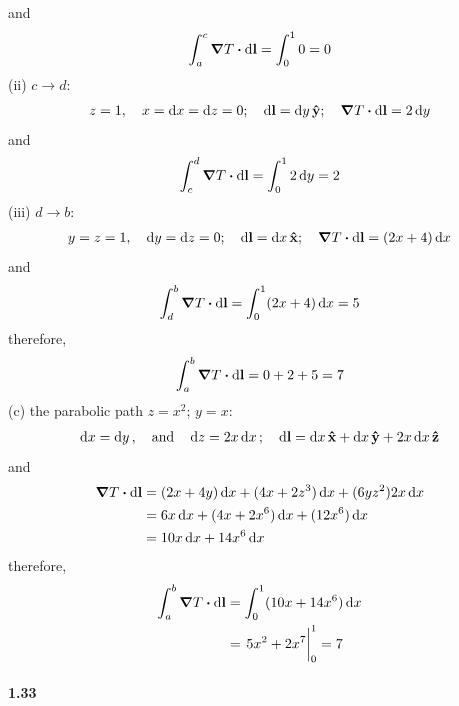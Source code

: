 \documentclass[../main.tex]{subfiles}
\begin{document}
and
\begin{align*}
    \int_a^c \grad{T} \vdot \dd{\vb{l}} = \int_0^1 0 = 0
\end{align*}
(ii) $c \to d$:
\begin{align*}
    z = 1, \quad x = \dd{x} = \dd{z} = 0; \quad \dd{\vb{l}} = \dd{y} \vu{y};
        \quad \grad{T} \vdot \dd{\vb{l}} = 2 \dd{y}
\end{align*}
and
\begin{align*}
    \int_c^d \grad{T} \vdot \dd{\vb{l}} = \int_0^1 2 \dd{y} = 2
\end{align*}
(iii) $d \to b$:
\begin{align*}
    y = z = 1, \quad \dd{y} = \dd{z} = 0; \quad \dd{\vb{l}} = \dd{x} \vu{x};
        \quad \grad{T} \vdot \dd{\vb{l}} = (2x+4) \dd{x}
\end{align*}
and
\begin{align*}
    \int_d^b \grad{T} \vdot \dd{\vb{l}} = \int_0^1 (2x+4) \dd{x} = 5
\end{align*}
therefore,
\begin{align*}
    \int_a^b \grad{T} \vdot \dd{\vb{l}} = 0 + 2 + 5 = 7
\end{align*}
(c) the parabolic path $z = x^2$; $y = x$:
\begin{align*}
    \dd{x} = \dd{y}, \qand \dd{z} = 2x \dd{x}; \quad
    \dd{\vb{l}} = \dd{x} \vu{x} + \dd{x} \vu{y} + 2x\dd{x} \vu{z}
\end{align*}
and
\begin{align*}
    \grad{T} \vdot \dd{\vb{l}} &= (2x+4y) \dd{x} + (4x+2z^3) \dd{x} + (6yz^2) 2x\dd{x} \\
    &= 6x \dd{x} + (4x + 2x^6) \dd{x} + (12x^6) \dd{x} \\
    &= 10x \dd{x} + 14x^6 \dd{x}
\end{align*}
therefore,
\begin{align*}
    \int_a^b \grad{T} \vdot \dd{\vb{l}} &= \int_0^1 (10x + 14x^6) \dd{x} \\
    &= \eval{5x^2 + 2x^7}_0^1 = 7
\end{align*}

\paragraph{1.33}
\end{document}
